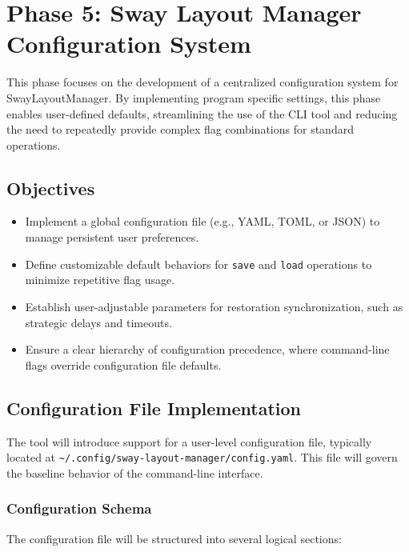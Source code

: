 \newpage

\section{Phase 5: Sway Layout Manager Configuration System}

This phase focuses on the development of a centralized configuration system for SwayLayoutManager. By implementing program specific settings, this phase enables user-defined defaults, streamlining the use of the CLI tool and reducing the need to repeatedly provide complex flag combinations for standard operations.

\subsection{Objectives}

\begin{itemize}
    \item Implement a global configuration file (e.g., YAML, TOML, or JSON) to manage persistent user preferences.
    \item Define customizable default behaviors for \texttt{save} and \texttt{load} operations to minimize repetitive flag usage.
    \item Establish user-adjustable parameters for restoration synchronization, such as strategic delays and timeouts.
    \item Ensure a clear hierarchy of configuration precedence, where command-line flags override configuration file defaults.
\end{itemize}

\subsection{Configuration File Implementation}

The tool will introduce support for a user-level configuration file, typically located at \texttt{\~{}/.config/sway-layout-manager/config.yaml}. This file will govern the baseline behavior of the command-line interface.

\subsubsection{Configuration Schema}

The configuration file will be structured into several logical sections:

